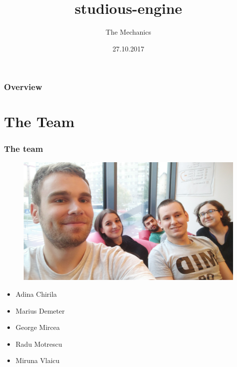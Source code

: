 \documentclass{beamer}
\title[studious-engine]{studious-engine} %
\author{The Mechanics} %
\date{27.10.2017} %
\begin{document}
\begin{frame}
\titlepage %
\end{frame}

\begin{frame}
\frametitle{Overview} %
\tableofcontents %
\end{frame}



\section{The Team} %

\begin{frame}
\frametitle{The team}
\begin {figure}
\includegraphics[width=\textwidth,height=0.5\textheight]{team}
\end {figure}
\begin{itemize}
\item Adina Chirila
\item Marius Demeter
\item George Mircea
\item Radu Motrescu
\item Miruna Vlaicu
\end{itemize}
\end{frame}
\end{document}
